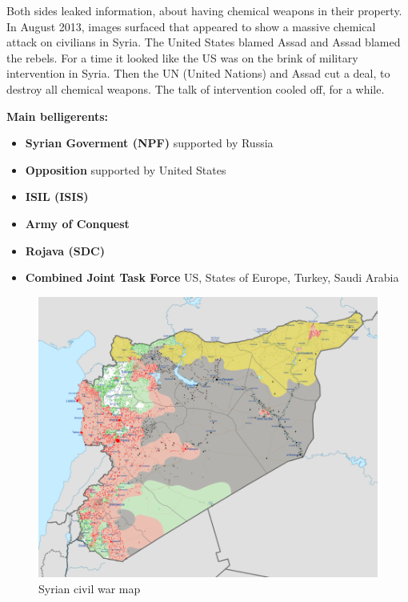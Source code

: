 Both sides leaked information, about having chemical weapons in their property. In August 2013, images surfaced that appeared to show a massive chemical attack on civilians in Syria. The United States blamed Assad and Assad blamed the rebels.
For a time it looked like the US was on the brink of military intervention in Syria. Then the UN (United Nations) and Assad cut a deal, to destroy all chemical weapons. The talk of intervention cooled off, for a while. \newline


\textbf{Main belligerents: }
\begin{itemize}
	\item \textbf{Syrian Goverment (NPF)}
		\subitem supported by Russia
	\item \textbf{Opposition}
		\subitem supported by United States
	\item \textbf{ISIL (ISIS)}
	\item \textbf{Army of Conquest}
	\item \textbf{Rojava (SDC)}
	\item \textbf{Combined Joint Task Force}
		\subitem US, States of Europe, Turkey, Saudi Arabia
\end{itemize}

\newpage

\begin{figure}[!h]
	\begin{center}
		\includegraphics[width=\linewidth]{images/Syrian_Civil_War_map}
		\caption{Syrian civil war map}
	\end{center}
\end{figure}

